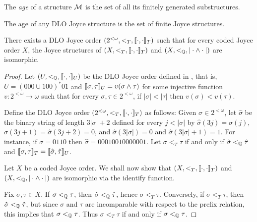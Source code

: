 The \emph{age} of a structure $\mathcal{M}$ is the set of all its finitely generated substructures.

\begin{corollary}
  The age of any DLO Joyce structure is the set of finite Joyce structures.
\end{corollary}


\begin{theorem}[$\RCA_0$]\label{thm:joyce-diagonalization}
There exists a DLO Joyce order $(2^{<\omega}, <_T, \llbracket \cdot , \cdot \rrbracket_T)$
such that for every coded Joyce order $X$,
the Joyce structures of $(X,  <_T, \llbracket \cdot , \cdot \rrbracket_T)$ and $(X, <_{\mathbb{Q}}, |\cdot \wedge \cdot|)$ are isomorphic.
\end{theorem}
\begin{proof}
Let $(U, <_{\mathbb{Q}}, \llbracket \cdot , \cdot \rrbracket_U)$ be the DLO Joyce order defined in , that is, $U = (000 \cup 100)^{*}01$ and $\llbracket \sigma , \tau \rrbracket_U = v(\sigma \wedge \tau)$ for some injective function $v: 2^{<\omega} \to \omega$ such that
for every $\sigma, \tau \in 2^{<\omega}$, if $|\sigma| < |\tau|$ then $v(\sigma) < v(\tau)$.

Define the DLO Joyce order $(2^{<\omega}, <_T,  \llbracket \cdot , \cdot \rrbracket_T)$ as follows:
Given $\sigma \in 2^{<\omega}$, let $\hat{\sigma}$ be the binary string of length $3|\sigma|+2$
defined for every $j < |\sigma|$ by $\hat{\sigma}(3j) = \sigma(j)$, $\hat{\sigma}(3j+1) = \hat{\sigma}(3j+2) = 0$, and $\hat{\sigma}(3|\sigma|) = 0$ and $\hat{\sigma}(3|\sigma|+1) = 1$.
For instance, if $\sigma = 0110$ then $\hat{\sigma} = 00010010000001$.
Let $\sigma <_T \tau$ if and only if $\hat{\sigma} <_{\mathbb{Q}} \hat{\tau}$
and $\llbracket \sigma , \tau \rrbracket_T = \llbracket \hat{\sigma} , \hat{\tau} \rrbracket_U$.

Let $X$ be a coded Joyce order. We shall now show that $(X,  <_T, \llbracket \cdot , \cdot \rrbracket_T)$ and \mbox{$(X, <_{\mathbb{Q}}, |\cdot \wedge \cdot|)$} are isomorphic via the identify function.  

Fix $\sigma, \tau \in X$. If $\sigma <_{\mathbb{Q}} \tau$, then $\hat{\sigma} <_{\mathbb{Q}} \hat{\tau}$, hence $\sigma <_T \tau$. Conversely, if $\sigma <_T \tau$, then $\hat{\sigma} <_{\mathbb{Q}} \hat{\tau}$, but since $\sigma$ and $\tau$ are incomparable with respect to the prefix relation, this implies that $\sigma <_{\mathbb{Q}} \tau$. Thus $\sigma <_T \tau$ if and only if $\sigma <_{\mathbb{Q}} \tau$.


\end{proof}
